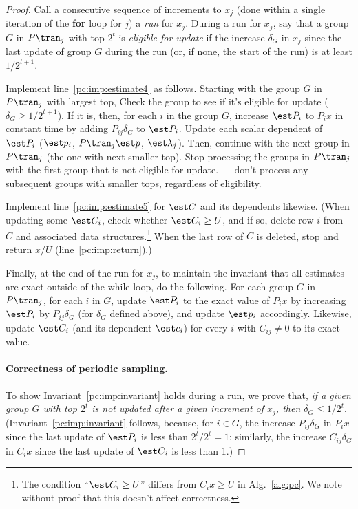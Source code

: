 \begin{proof}
  Call a consecutive sequence of increments to $x_j$
  (done within a single iteration of the {\bf for} loop for $j$) a \emph{run} for $x_j$.
  During a run for $x_j$,
  say that a group $G$ in $P\tran_j$ with top $2^t$ is \emph{eligible for update}
  if the increase $\delta_G$ in $x_j$ 
  since the last update of group $G$ during the run
  (or, if none, the start of the run) is at least $1/2^{t+1}$.

  Implement line~\ref{pc:imp:estimate4} as follows. 
  Starting with the group $G$ in $P\tran_j$ with largest top,
  Check the group to see if it's eligible for update ($\delta_G \ge 1/2^{t+1}$).
  If it is, then, for each $i$ in the group $G$, increase $\est P_i$ to $P_i x$
  in constant time by adding $P_{ij} \delta_G$ to $\est P_i$.
  Update each scalar dependent of $\est P_i$ 
  ($\est p_i$, $P\tran_j \est p$, $\est\lambda_j$).
  Then, continue with the next group in $P\tran_j$ (the one with next smaller top).
  Stop processing the groups in $P\tran_j$ 
  with the first group that is not eligible for update.
  --- don't process any subsequent groups with smaller tops, regardless of eligibility.

  Implement line~\ref{pc:imp:estimate5} for $\est C$ and its dependents likewise.
  (When updating some $\est C_i$, check
  whether $\est C_i \ge U$, and if so, delete row $i$ from $C$
  and associated data structures.\footnote
  {The condition ``$\est C_i \ge U$'' 
  differs from $C_i x \ge U$ in Alg.~\ref{alg:pc}.
  We note without proof that this doesn't affect correctness.}
  When the last row of $C$ is deleted, stop and return $x/U$
  (line~\ref{pc:imp:return}).)

  \smallskip

  Finally, at the end of the run for $x_j$,
  to maintain the invariant that all estimates are exact outside of the while loop,
  do the following.
  For each group $G$ in $P\tran_j$,
  for each $i$ in $G$,
  update $\est P_i$ to the exact value of $P_i x$ by increasing
  $\est P_i$ by $P_{ij}\delta_G$ (for $\delta_G$ defined above),
  and update $\est p_i$ accordingly.
  Likewise, update $\est C_i$ (and its dependent $\est c_i$) 
  for every $i$ with $C_{ij} \ne 0$ to its exact value.

  \paragraph{Correctness of periodic sampling.}
  To show Invariant~\eqref{pc:imp:invariant} holds during a run,
  we prove that, \emph{if a given group $G$ with top $2^t$ is not updated
  after a given increment of $x_j$, then $\delta_G \le 1/2^t$}.
  (Invariant~\eqref{pc:imp:invariant} follows,
  because, for $i\in G$, the increase $P_{ij}\delta_G$ in $P_i x$ 
  since the last update of $\est P_i$ is less than $2^t / 2^t = 1$;
  similarly, the increase $C_{ij}\delta_G$ in $C_i x$
  since the last update of $\est C_i$ is less than 1.)


\end{proof}
